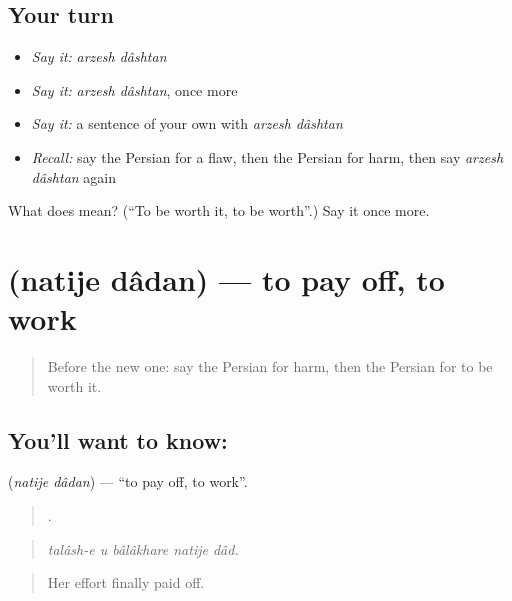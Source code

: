 \subsection*{Your turn}
\begin{itemize}
\raggedright
  \item \emph{Say it:} \emph{arzesh dâshtan}
  \item \emph{Say it:} \emph{arzesh dâshtan}, once more
  \item \emph{Say it:} a sentence of your own with \emph{arzesh dâshtan}
  \item \emph{Recall:} say the Persian for a flaw, then the Persian for harm, then say \emph{arzesh dâshtan} again
\end{itemize}

\begin{tcolorbox}[breakable,colback=teal!4,colframe=teal!35!black,title={Before you move on}]
What does   mean? (\textquotedblleft{}To be worth it, to be worth\textquotedblright{}.) Say it once more.
\end{tcolorbox}
\section[\texorpdfstring{\fa{نتیجه} \fa{دادن} (natije dâdan)}{نتیجه دادن (natije dâdan)}]{  (natije dâdan) — to pay off, to work}

\label{lesson:FA-C375-natije-dadan}



\begin{quote}
Before the new one: say the Persian for harm, then the Persian for to be worth it.
\end{quote}

\subsection*{You'll want to know:  }
\textbf{ } (\emph{natije dâdan}) — \textquotedblleft{}to pay off, to work\textquotedblright{}.

\begin{quote}
    .
\end{quote}

\begin{quote}
\emph{talâsh-e u bâlâkhare natije dâd.}
\end{quote}

\begin{quote}
Her effort finally paid off.
\end{quote}


